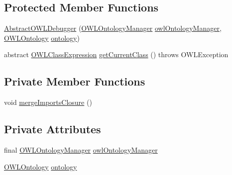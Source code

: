 \subsection*{Protected Member Functions}
\begin{DoxyCompactItemize}
\item 
\hyperlink{classorg_1_1semanticweb_1_1owlapi_1_1debugging_1_1_abstract_o_w_l_debugger_a40043be2c56497b63dea599150e518c8}{Abstract\-O\-W\-L\-Debugger} (\hyperlink{interfaceorg_1_1semanticweb_1_1owlapi_1_1model_1_1_o_w_l_ontology_manager}{O\-W\-L\-Ontology\-Manager} \hyperlink{classorg_1_1semanticweb_1_1owlapi_1_1debugging_1_1_abstract_o_w_l_debugger_a7949b6ba4646ecc943e0015467210946}{owl\-Ontology\-Manager}, \hyperlink{interfaceorg_1_1semanticweb_1_1owlapi_1_1model_1_1_o_w_l_ontology}{O\-W\-L\-Ontology} \hyperlink{classorg_1_1semanticweb_1_1owlapi_1_1debugging_1_1_abstract_o_w_l_debugger_a752fe8de84b07aa7d41877eb3a9e8167}{ontology})
\item 
abstract \hyperlink{interfaceorg_1_1semanticweb_1_1owlapi_1_1model_1_1_o_w_l_class_expression}{O\-W\-L\-Class\-Expression} \hyperlink{classorg_1_1semanticweb_1_1owlapi_1_1debugging_1_1_abstract_o_w_l_debugger_a68de9ab03a4cca653a3db60f0c13c71d}{get\-Current\-Class} ()  throws O\-W\-L\-Exception
\end{DoxyCompactItemize}
\subsection*{Private Member Functions}
\begin{DoxyCompactItemize}
\item 
void \hyperlink{classorg_1_1semanticweb_1_1owlapi_1_1debugging_1_1_abstract_o_w_l_debugger_a43c31ab62baa46e97b295b4b81f59104}{merge\-Imports\-Closure} ()
\end{DoxyCompactItemize}
\subsection*{Private Attributes}
\begin{DoxyCompactItemize}
\item 
final \hyperlink{interfaceorg_1_1semanticweb_1_1owlapi_1_1model_1_1_o_w_l_ontology_manager}{O\-W\-L\-Ontology\-Manager} \hyperlink{classorg_1_1semanticweb_1_1owlapi_1_1debugging_1_1_abstract_o_w_l_debugger_a7949b6ba4646ecc943e0015467210946}{owl\-Ontology\-Manager}
\item 
\hyperlink{interfaceorg_1_1semanticweb_1_1owlapi_1_1model_1_1_o_w_l_ontology}{O\-W\-L\-Ontology} \hyperlink{classorg_1_1semanticweb_1_1owlapi_1_1debugging_1_1_abstract_o_w_l_debugger_a752fe8de84b07aa7d41877eb3a9e8167}{ontology}
\end{DoxyCompactItemize}


